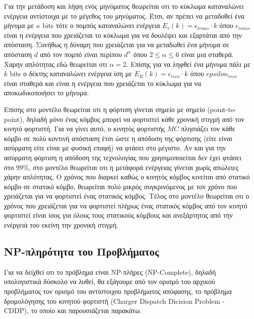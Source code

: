 Για την μετάδοση και λήψη ενός μηνύματος θεωρείται οτι το κύκλωμα καταναλώνει ενέργεια αντίστοιχα με το μέγεθος του μηνύματος. Έτσι, αν πρέπει να μεταδοθεί ένα
μήνυμα με $κ$ bits τότε ο πομπός καταναλώνει ενέργεια $E_{\tau}(k) = \epsilon_{trans}\cdot k$ όπου $\epsilon_{trans}$ είναι η ενέργεια που
χρειάζεται το κύκλωμα για να δουλέψει και εξαρτάται από την απόσταση. Συνήθως η δύναμη που χρειάζεται για να μεταδωθεί ένα μήνυμα σε απόσταση $d$ από τον πομπό είναι
περίπου $d^{\alpha}$ όπου $2\leq\alpha\leq6$ είναι μια σταθερά. Χαρην απλότητας εδώ θεωρείται οτι $\alpha = 2$. Επίσης για να ληφθεί ένα μήνυμα πάλι με $k$ bits ο
δέκτης καταναλώνει ενέργεια ίση με $E_{R}(k) = \epsilon_{recv}\cdot k$ όπου $epsilon_{recv}$ είναι σταθερά και είναι η ενέργεια που χρειάζεται το κύκλωμα για να
αποκωδικοποιήσει το μήνυμα.

Επίσης στο μοντέλο θεωρείται οτι η φόρτιση γίνεται σημείο με σημείο (point-to-point), δηλαδή μόνο ένας κόμβος μπορεί να φορτιστεί κάθε χρονική στιγμή από τον κινητό
φορτιστή. Για να γίνει αυτό, ο κινητός φορτιστής $MC$ πλησιάζει τον κάθε κόμβο σε πολύ κοντινή απόσταση έτσι ώστε η απόδοση της φόρτισης (είτε είναι ασύρματη είτε
είναι με φυσική επαφή) να φτάσει στο μέγιστο. Αν και για την ασύρματη φόρτιση η απόδοση της τεχνολογίας που χρησιμοποιείται δεν έχει φτάσει στο 99\%, στο μοντέλο
θεωρείται οτι η μετάφορά ενέργειας γίνεται χωρίς απώλειες χάρην απλότητας. Ο χρόνος που διαρκεί καθώς ο κινητός κόμβος κινείται από στατικό κόμβο σε στατικό κόμβο,
θεωρείται πολύ μικρός συγκρινόμενος με τον χρόνο που χρειάζεται για να φορτιστεί ένας στατικός κόμβος. Τέλος στο μοντέλο θεωρείται οτι ο χρόνος που χρειάζεται για να
φορτιστεί πλήρως ένας στατικός κόμβος από τον κινητό φορτιστεί είναι ίσος για όλους τους στατικούς κόμβους και ανεξάρτητος από την ενέργειά του εκείνη την χρονική
στιγμή.


\subsection{NP-πληρότητα του Προβλήματος}
Για να δείχθεί οτι το πρόβλημα είναι NP-πλήρες (NP-Complete), δηλαδή υπολογιστικά δύσκολο να λυθεί, θα εξάγουμε από τον ορισμό του αρχικού προβλήματος τον ορισμό του
αντίστοιχου προβλήματος απόφασης, το πρόβλημα δρομολόγησης του κινητού φορτιστή  (Charger Dispatch Dicision Problem - CDDP), το οποίο και παρουσιάζεται παρακάτω.

